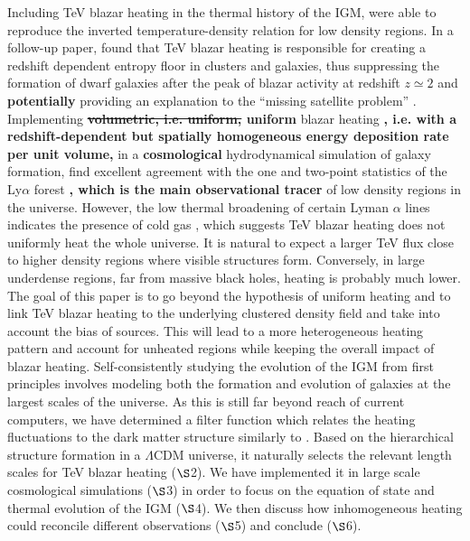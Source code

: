 \documentclass[twocolumns]{emulateapj}
\newcommand\Ec[1]{{\color{magenta} \bf #1}} %
\begin{document}
Including TeV blazar heating in the thermal history of the IGM, \citet{2012ApJ...752...23C} were able to reproduce the inverted temperature-density relation for low density regions. In a follow-up paper, \citet{2012ApJ...752...24P} found that TeV blazar heating is responsible for creating a redshift dependent entropy floor in clusters and galaxies, thus suppressing the formation of dwarf galaxies after the peak of blazar activity at redshift $z\simeq2$ and \Ec{potentially} providing an explanation to the ``missing satellite problem'' \citep{2010AdAst2010E...8K}. Implementing \Ec{\sout{volumetric, i.e. uniform,} uniform} blazar heating\Ec{, i.e. with a redshift-dependent but spatially homogeneous energy deposition rate per unit volume,} in a \Ec{cosmological} hydrodynamical simulation of galaxy formation, \citet{2012MNRAS.423..149P} find excellent agreement with the one and two-point statistics of the Ly$\alpha$ forest\Ec{, which is the main observational tracer} of low density regions in the universe.
However, the low thermal broadening of certain Lyman $\alpha$ lines indicates the presence of cold gas \citep{2012ApJ...757L..30R}, which suggests TeV blazar heating does not uniformly heat the whole universe. It is natural to expect a larger TeV flux close to higher density regions where visible structures form. Conversely, in large underdense regions, far from massive black holes, heating is probably much lower. The goal of this paper is to go beyond the hypothesis of uniform heating and to link TeV blazar heating to the underlying clustered density field and take into account the bias of sources. This will lead to a more heterogeneous heating pattern and account for unheated regions while keeping the overall impact of blazar heating.
Self-consistently studying the evolution of the IGM from first principles involves modeling both the formation and evolution of galaxies at the largest scales of the universe. As this is still far beyond reach of current computers, we have determined a filter function which relates the heating fluctuations to the dark matter structure similarly to \citet{2007MNRAS.376.1680P,2005ApJ...626....1B,2014PhRvD..89h3010P}. Based on the hierarchical structure formation in a $\Lambda$CDM universe, it naturally selects the relevant length scales for TeV blazar heating ($\S$2). We have implemented it in large scale cosmological simulations ($\S$3) in order to focus on the equation of state and thermal evolution of the IGM ($\S$4). We then discuss how inhomogeneous heating could reconcile different observations ($\S$5) and conclude ($\S$6).
\end{document}
